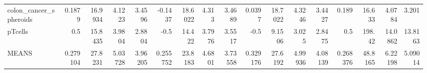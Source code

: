 \begin{tabular}{lrrrrrrrrrrrrrrrr}
 colon\_cancer\_spheroids                      &              0.1879   &          16.9934 &           4.1223  &          3.4596  &        -0.1437   &     18.6022 &       4.313  &     3.4689  &       0.0397   &   18.7022 &    4.3246  &   3.4427  &         0.189    &     16.633  &      4.0784  &     3.201   \\
 pTcells                                     &              0.5      &          15.8435 &           3.9804  &          2.8804  &        -0.5      &     14.422  &       3.7976 &     3.5517  &      -0.5      &    9.1506 &    3.025   &   2.8475  &         0.5      &    198.42   &     14.0862  &    13.8163  \\
 MEANS                                       &              0.279104 &          27.8231 &           5.03728 &          3.96205 &         0.255752 &     23.8183 &       4.6801 &     3.73558 &       0.329176 &   27.6192 &    4.99936 &   4.08139 &         0.268376 &     48.8165 &      6.22198 &     5.09014 \\
\hline
\end{tabular}